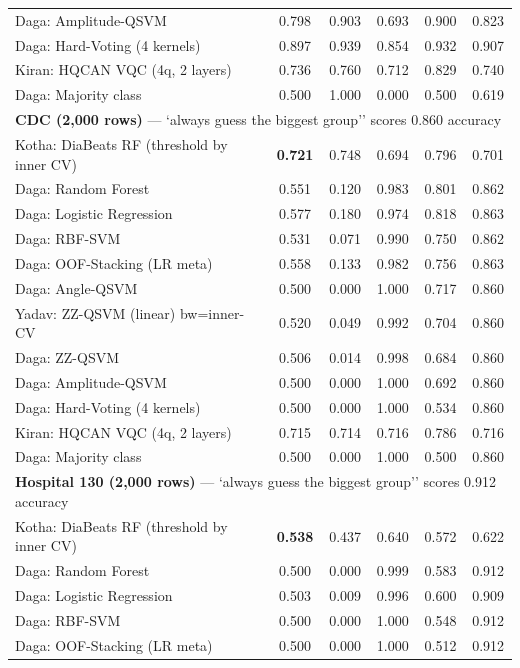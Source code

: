 \begin{tabular}{lccccc}
Daga: Amplitude-QSVM & 0.798 & 0.903 & 0.693 & 0.900 & 0.823\\
Daga: Hard-Voting (4 kernels) & 0.897 & 0.939 & 0.854 & 0.932 & 0.907\\
Kiran: HQCAN VQC (4q, 2 layers) & 0.736 & 0.760 & 0.712 & 0.829 & 0.740\\
Daga: Majority class & 0.500 & 1.000 & 0.000 & 0.500 & 0.619\\
\midrule\multicolumn{6}{l}{\textbf{CDC (2,000 rows)} --- `always guess the biggest group'' scores 0.860 accuracy}\\
Kotha: DiaBeats RF (threshold by inner CV) & \textbf{0.721} & 0.748 & 0.694 & 0.796 & 0.701\\
Daga: Random Forest & 0.551 & 0.120 & 0.983 & 0.801 & 0.862\\
Daga: Logistic Regression & 0.577 & 0.180 & 0.974 & 0.818 & 0.863\\
Daga: RBF-SVM & 0.531 & 0.071 & 0.990 & 0.750 & 0.862\\
Daga: OOF-Stacking (LR meta) & 0.558 & 0.133 & 0.982 & 0.756 & 0.863\\
Daga: Angle-QSVM & 0.500 & 0.000 & 1.000 & 0.717 & 0.860\\
Yadav: ZZ-QSVM (linear) bw=inner-CV & 0.520 & 0.049 & 0.992 & 0.704 & 0.860\\
Daga: ZZ-QSVM & 0.506 & 0.014 & 0.998 & 0.684 & 0.860\\
Daga: Amplitude-QSVM & 0.500 & 0.000 & 1.000 & 0.692 & 0.860\\
Daga: Hard-Voting (4 kernels) & 0.500 & 0.000 & 1.000 & 0.534 & 0.860\\
Kiran: HQCAN VQC (4q, 2 layers) & 0.715 & 0.714 & 0.716 & 0.786 & 0.716\\
Daga: Majority class & 0.500 & 0.000 & 1.000 & 0.500 & 0.860\\
\midrule\multicolumn{6}{l}{\textbf{Hospital 130 (2,000 rows)} --- `always guess the biggest group'' scores 0.912 accuracy}\\
Kotha: DiaBeats RF (threshold by inner CV) & \textbf{0.538} & 0.437 & 0.640 & 0.572 & 0.622\\
Daga: Random Forest & 0.500 & 0.000 & 0.999 & 0.583 & 0.912\\
Daga: Logistic Regression & 0.503 & 0.009 & 0.996 & 0.600 & 0.909\\
Daga: RBF-SVM & 0.500 & 0.000 & 1.000 & 0.548 & 0.912\\
Daga: OOF-Stacking (LR meta) & 0.500 & 0.000 & 1.000 & 0.512 & 0.912\\

\end{tabular}
